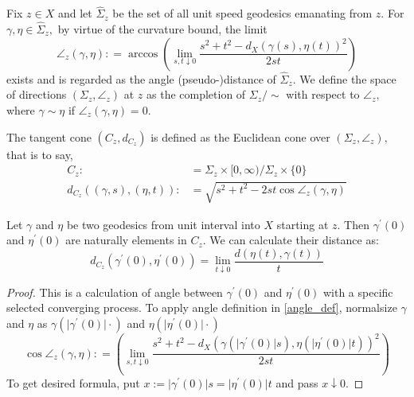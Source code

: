 \begin{defn}
	Fix \( z \in X \) and let \( \hat { \Sigma } _ { z } \) be the set of all unit speed geodesics emanating from \( z \). For \( \gamma , \eta \in \hat { \Sigma } _ { z } , \) by virtue of the curvature bound, the limit
	\begin{equation}
		\label{angle_def}
		\angle _ { z } ( \gamma , \eta ): = \arccos \left( \lim _ { s , t \downarrow 0 } \frac { s ^ { 2 } + t ^ { 2 } - d _ { X }\left( \gamma ( s ) , \eta ( t ) \right) ^ { 2 } } { 2 s t } \right)
	\end{equation}
	exists and is regarded as the angle (pseudo-)distance of \( \hat { \Sigma } _ { z } . \) We define the space of directions \( \left( \Sigma _ { z } , \angle _ { z } \right) \) at \( z \) as the completion of \( \Sigma _ { z } / \sim \) with respect to \( \angle _ { z } , \) where \( \gamma \sim \eta \) if \( \angle _ { z } ( \gamma , \eta ) = 0 . \)
\end{defn}

\begin{defn}
	The tangent cone \( \left( C _ { z } , d _ { C _ { z } } \right) \) is defined as the Euclidean cone over \( \left( \Sigma _ { z } , \angle _ { z } \right) , \)
	that is to say,
	\begin{align*}
		C _ { z }:                                           & = \Sigma _ { z } \times [ 0 , \infty ) / \Sigma _ { z } \times \{ 0 \}          \\
		d _ { C _ { z } } ( ( \gamma , s ) , ( \eta , t ) ): & = \sqrt { s ^ { 2 } + t ^ { 2 } - 2 s t \cos \angle _ { z } ( \gamma , \eta ) }
	\end{align*}
\end{defn}

\begin{thm}
	Let $\gamma$ and  $\eta$ be two geodesics from unit interval into $X$ starting at $z$.  Then $\gamma^\prime(0)$ and $\eta^\prime(0)$ are naturally elements in $C_z$.  We can calculate their distance as:
	\[  d_{C_z}(\gamma^\prime(0),\eta^\prime(0))=\lim _ { t \downarrow 0 } \frac  {d ( \eta ( t ) , \gamma ( t ) )  }{ t }\]
\end{thm}

\begin{proof}
	This is a calculation of angle between $\gamma^\prime(0)$ and $\eta^\prime(0)$ with a specific selected converging process. To apply angle definition in \ref{angle_def}, normalsize $\gamma$ and $\eta$ as $\gamma\left(\vert\gamma^\prime(0)\vert \cdot\right)$ and $\eta\left(\vert\eta^\prime(0)\vert \cdot\right)$
	\[
		\cos\angle _ { z } ( \gamma , \eta ): = \left( \lim _ { s , t \downarrow 0 } \frac { s ^ { 2 } + t ^ { 2 } - d _ { X }\left( \gamma (\vert \gamma^\prime(0)\vert s ) , \eta (\vert \eta^\prime(0)\vert  t ) \right) ^ { 2 } } { 2 s t } \right)
	\]
	To get desired formula, put $ x := \vert  \gamma^\prime(0)\vert s =\vert \eta^\prime(0)\vert t $ and pass $x \downarrow 0$.
\end{proof}

